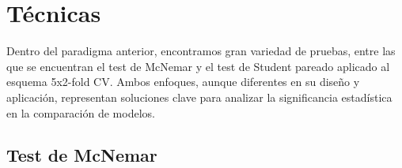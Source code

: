 \documentclass[a4paper,12pt]{article}
\begin{document}


\newpage
\section{Técnicas}

Dentro del paradigma anterior, encontramos gran variedad de pruebas, entre las que se encuentran el test de McNemar y el test de Student pareado aplicado al esquema 5x2-fold CV. Ambos enfoques, aunque diferentes en su diseño y aplicación, representan soluciones clave para analizar la significancia estadística en la comparación de modelos.

\subsection{Test de McNemar}
\end{document}
